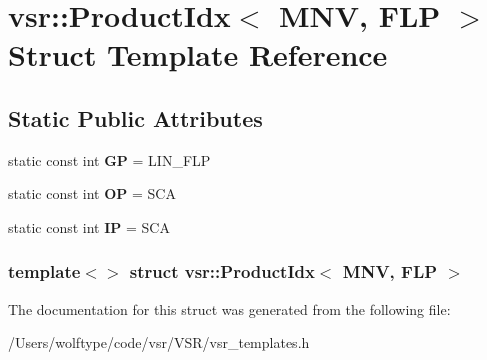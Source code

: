 \hypertarget{structvsr_1_1_product_idx_3_01_m_n_v_00_01_f_l_p_01_4}{\section{vsr\-:\-:Product\-Idx$<$ M\-N\-V, F\-L\-P $>$ Struct Template Reference}
\label{structvsr_1_1_product_idx_3_01_m_n_v_00_01_f_l_p_01_4}
}
\subsection*{Static Public Attributes}
\begin{DoxyCompactItemize}
\item 
\hypertarget{structvsr_1_1_product_idx_3_01_m_n_v_00_01_f_l_p_01_4_a60872f2cc6ff2aaff18d919c7da2e191}{static const int {\bfseries G\-P} = L\-I\-N\-\_\-\-F\-L\-P}\label{structvsr_1_1_product_idx_3_01_m_n_v_00_01_f_l_p_01_4_a60872f2cc6ff2aaff18d919c7da2e191}

\item 
\hypertarget{structvsr_1_1_product_idx_3_01_m_n_v_00_01_f_l_p_01_4_a664126001c2d528b93c47d7987049e0c}{static const int {\bfseries O\-P} = S\-C\-A}\label{structvsr_1_1_product_idx_3_01_m_n_v_00_01_f_l_p_01_4_a664126001c2d528b93c47d7987049e0c}

\item 
\hypertarget{structvsr_1_1_product_idx_3_01_m_n_v_00_01_f_l_p_01_4_a702263b36c7ff76fa2363a7edf75be6c}{static const int {\bfseries I\-P} = S\-C\-A}\label{structvsr_1_1_product_idx_3_01_m_n_v_00_01_f_l_p_01_4_a702263b36c7ff76fa2363a7edf75be6c}

\end{DoxyCompactItemize}
\subsubsection*{template$<$$>$ struct vsr\-::\-Product\-Idx$<$ M\-N\-V, F\-L\-P $>$}



The documentation for this struct was generated from the following file\-:\begin{DoxyCompactItemize}
\item 
/\-Users/wolftype/code/vsr/\-V\-S\-R/vsr\-\_\-templates.\-h\end{DoxyCompactItemize}
